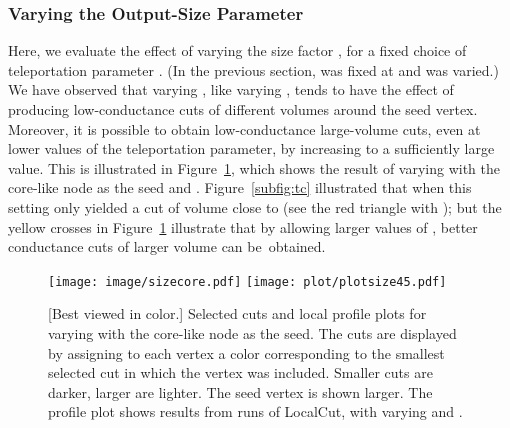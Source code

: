 \documentclass[11pt]{article}
\begin{document}
\subsubsection{Varying the Output-Size Parameter}
\label{sec:size}

Here, we evaluate the effect of varying the size factor , for a fixed 
choice of teleportation parameter .
(In the previous section,  was fixed at  and  was varied.)
We have observed that varying , like varying , tends to have the 
effect of producing low-conductance cuts of different volumes around the 
seed vertex. 
Moreover, it is possible to obtain low-conductance large-volume cuts, even 
at lower values of the teleportation parameter, by increasing  to a 
sufficiently large value.
This is illustrated in Figure~\ref{fig:sizecore}, which shows the result of 
varying  with the core-like node as the seed and . 
Figure~\ref{subfig:tc} illustrated that when  this setting only yielded 
a cut of volume close to  (see the red triangle with );
but the yellow crosses in Figure~\ref{fig:sizecore} illustrate that by 
allowing larger values of , better conductance cuts of larger volume can 
be~obtained. 

\begin{figure}[h]
\centering
\texttt{[image: image/sizecore.pdf]}
\hspace{.7in}
\texttt{[image: plot/plotsize45.pdf]}
\caption{[Best viewed in color.]  Selected cuts and local profile plots for varying  with the core-like node as the seed. The cuts are displayed by assigning to each vertex a color corresponding to the smallest selected cut in which the vertex was included. Smaller cuts are darker, larger are lighter. The seed vertex is shown larger. The profile plot shows results from  runs of \textsf{LocalCut}, with varying  and  . }
\label{fig:sizecore}
\end{figure}
\end{document}
